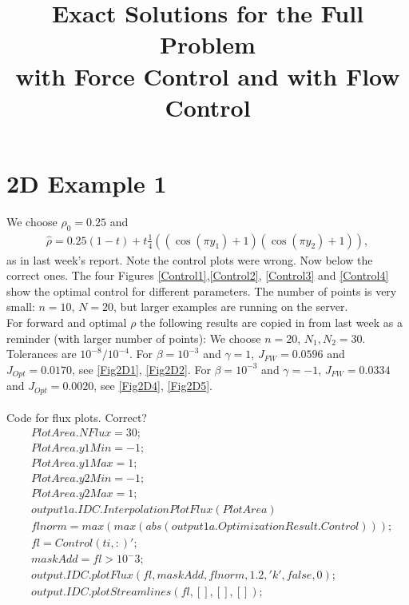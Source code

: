 \documentclass[11pt, a4paper]{article}
\title{Exact Solutions for the Full Problem \\with Force Control and with Flow Control}
\date{}
\theoremstyle{definition}
\begin{document}
	\section{2D Example 1}
	We choose $\rho_0 = 0.25$ and
	\begin{align*}
	\hat \rho = 0.25(1-t) + t\frac{1}{4}((\cos(\pi y_1)+1)(\cos(\pi y_2)+1)),  
	\end{align*}
	as in last week's report. Note the control plots were wrong. Now below the correct ones. The four Figures \ref{Control1},\ref{Control2}, \ref{Control3} and \ref{Control4} show the optimal control for different parameters. The number of points is very small: $n=10$, $N =20$, but larger examples are running on the server.\\
	For forward and optimal $\rho$ the following results are copied in from last week as a reminder (with larger number of points):
	We choose $n = 20$, $N_1,N_2 = 30$. Tolerances are $10^{-8}/10^{-4}$.
	For $\beta = 10^{-3}$ and $\gamma = 1$, $J_{FW} = 0.0596$ and $J_{Opt} = 0.0170$, see \ref{Fig2D1}, \ref{Fig2D2}.
	For $\beta = 10^{-3}$ and $\gamma = -1$, $J_{FW} = 0.0334$ and $J_{Opt} = 0.0020$, see \ref{Fig2D4}, \ref{Fig2D5}.
	\\
	\\
	Code for flux plots. Correct?
	\begin{align*}
	&PlotArea.NFlux = 30;\\
	&PlotArea.y1Min = -1;\\
	&PlotArea.y1Max = 1;\\
	&PlotArea.y2Min = -1;\\
	&PlotArea.y2Max = 1;\\
	&output1a.IDC.InterpolationPlotFlux(PlotArea)\\
	&flnorm = max(max(abs(output1a.OptimizationResult.Control)));\\
	&fl = Control(ti,:)';\\
	&maskAdd = fl > 10^-3;\\
	&output.IDC.plotFlux(fl,maskAdd,flnorm,1.2,'k',false,0);\\
	&output.IDC.plotStreamlines(fl,[],[],[]);	
	\end{align*}
	
\end{document}
